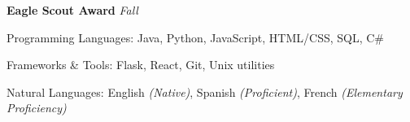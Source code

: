 \documentclass[10pt,letterpaper]{article}
\begin{document}
\headedsection
  {\textbf{Eagle Scout Award}}
  {\emph{Fall }}
  {}

\spacedhrule{0.5em}{-0.4em}


\inlineheadsection
  {Programming Languages:}
  {Java, Python, JavaScript, HTML/CSS, SQL, C\#}

\inlineheadsection
  {Frameworks \& Tools:}
  {Flask, React, Git, Unix utilities}

\inlineheadsection
  {Natural Languages:}
  {English \emph{(Native)}, Spanish \emph{(Proficient)}, French \emph{(Elementary Proficiency)}}
\end{document}
